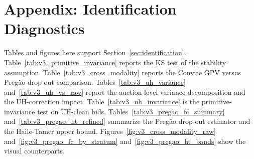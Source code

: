 





















\section{Appendix: Identification Diagnostics}\label{app:id}

Tables and figures here support Section~\ref{sec:identification}. Table~\ref{tab:v3_primitive_invariance} reports the KS test of the stability assumption. Table~\ref{tab:v3_cross_modality} reports the Convite GPV versus Preg\~ao drop-out comparison. Tables~\ref{tab:v3_uh_variance} and~\ref{tab:v3_uh_vs_raw} report the auction-level variance decomposition and the UH-correction impact. Table~\ref{tab:v3_uh_invariance} is the primitive-invariance test on UH-clean bids. Tables~\ref{tab:v3_pregao_fc_summary} and~\ref{tab:v3_pregao_ht_refined} summarize the Preg\~ao drop-out estimator and the Haile-Tamer upper bound. Figures~\ref{fig:v3_cross_modality_raw} and~\ref{fig:v3_pregao_fc_by_stratum} and~\ref{fig:v3_pregao_ht_bands} show the visual counterparts.









